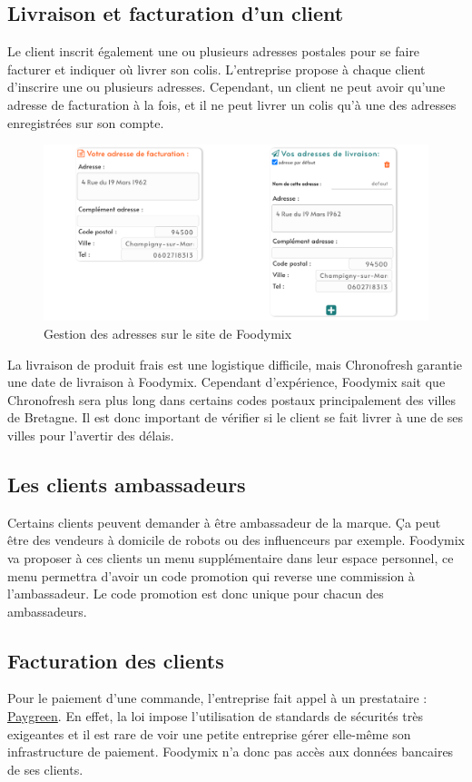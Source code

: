 \documentclass{article}
\begin{document}
\subsection{Livraison et facturation d'un client}
Le client inscrit également une ou plusieurs adresses postales pour se faire facturer et indiquer où livrer son colis. L'entreprise propose à chaque client d'inscrire une ou plusieurs adresses. Cependant, un client ne peut avoir qu'une adresse de facturation à la fois, et il ne peut livrer un colis qu'à une des adresses enregistrées sur son compte.
\begin{figure}[h]
    \centering
    \includegraphics[width=0.8\linewidth]{images/adresse_foodymix.png}
    \caption{Gestion des adresses sur le site de Foodymix}
\end{figure}

La livraison de produit frais est une logistique difficile, mais Chronofresh garantie une date de livraison à Foodymix. Cependant d'expérience, Foodymix sait que Chronofresh sera plus long dans certains codes postaux principalement des villes de Bretagne. Il est donc important de vérifier si le client se fait livrer à une de ses villes pour l'avertir des délais.

\subsection{Les clients ambassadeurs}
\label{Sub Ambassadeur}
Certains clients peuvent demander à être ambassadeur de la marque. Ça peut être des vendeurs à domicile de robots ou des influenceurs par exemple. Foodymix va proposer à ces clients un menu supplémentaire dans leur espace personnel, ce menu permettra d'avoir un code promotion qui reverse une commission à l'ambassadeur. Le code promotion est donc unique pour chacun des ambassadeurs.

\subsection{Facturation des clients}
Pour le paiement d'une commande, l'entreprise fait appel à un prestataire : \href{https://paygreeen.io}{Paygreen}. En effet, la loi impose l'utilisation de standards de sécurités très exigeantes et il est rare de voir une petite entreprise gérer elle-même son infrastructure de paiement. Foodymix n'a donc pas accès aux données bancaires de ses clients.
\end{document}

